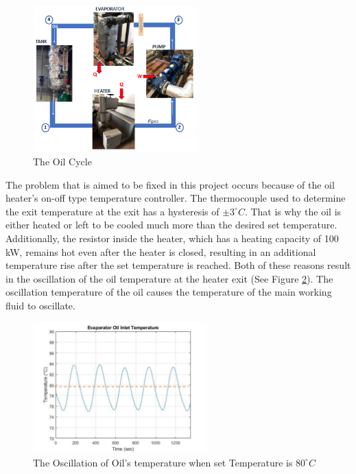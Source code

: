 	\begin{figure}[H]
		\centering
		\includegraphics[width=0.56\textwidth]{images/cycle.png}
		\caption[The Oil Cycle]{The Oil Cycle}
		\label{cycle} 
	\end{figure} 
	
The problem that is aimed to be fixed in this project occurs because of the oil heater's on-off type temperature controller. The thermocouple used to determine the exit temperature at the exit has a hysteresis of $\pm 3^\circ C$. That is why the oil is either heated or left to be cooled much more than the desired set temperature. Additionally, the resistor inside the heater, which has a heating capacity of 100 kW, remains hot even after the heater is closed, resulting in an additional temperature rise after the set temperature is reached. Both of these reasons result in the oscillation of the oil temperature at the heater exit (See Figure \ref{osc}). The oscillation temperature of the oil causes the temperature of the main working fluid to oscillate.

\begin{figure}[H]
		\centering
		\includegraphics[width=0.6\textwidth]{images/oscillation.jpg}
		\caption[The oscillation of oil's temperature when set temperature is $80^\circ C$] {The Oscillation of Oil's temperature when set Temperature is $80^\circ C$}
		\label{osc} 
\end{figure} 

